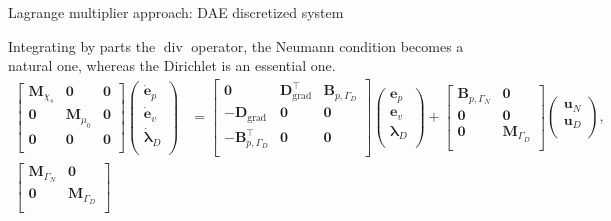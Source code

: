 \documentclass[aspectratio=169]{ISAE-Beamer}
\DeclareMathOperator*{\grad}{grad}
\renewcommand{\div}{\operatorname{div}}
\begin{document}
\begin{frame}{Lagrange multiplier approach: DAE discretized system}

Integrating by parts the $\div$ operator, the Neumann condition becomes a natural one, whereas the Dirichlet is an essential one.
\begin{equation*}
\begin{aligned}
\begin{bmatrix}
\mathbf{M}_{\chi_s} & \mathbf{0} & \mathbf{0}\\
\mathbf{0} & \mathbf{M}_{\mu_0} & \mathbf{0} \\
\mathbf{0} & \mathbf{0} & \mathbf{0} \\
\end{bmatrix}
\begin{pmatrix}
\dot{\mathbf{e}}_p\\
\dot{\mathbf{e}}_v\\
\dot{\bm{\lambda}}_D \\
\end{pmatrix}
&= \begin{bmatrix}
\mathbf{0} & \mathbf{D}_{\grad}^\top & \mathbf{B}_{p, \Gamma_D}\\
-\mathbf{D}_{\grad} & \mathbf{0} & \mathbf{0} \\
-\mathbf{B}_{p, \Gamma_D}^\top & \mathbf{0} & \mathbf{0} \\
\end{bmatrix}
\begin{pmatrix}
{\mathbf{e}}_p\\
{\mathbf{e}}_v\\
{\bm{\lambda}}_D \\
\end{pmatrix} + \begin{bmatrix}
\mathbf{B}_{p, \Gamma_N} & \mathbf{0}\\
\mathbf{0}& \mathbf{0}\\
\mathbf{0} & \mathbf{M}_{\Gamma_D} \\
\end{bmatrix}
\begin{pmatrix}
\mathbf{u}_N \\
\mathbf{u}_D \\
\end{pmatrix}, \\
\begin{bmatrix}
\mathbf{M}_{\Gamma_N} & \mathbf{0} \\
\mathbf{0} & \mathbf{M}_{\Gamma_D} \\
\end{bmatrix}

\end{aligned}
\end{equation*}
\end{frame}
\end{document}

